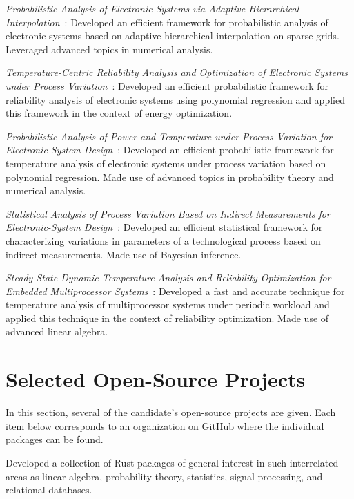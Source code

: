 \documentclass[journal]{IEEEtran}
\begin{document}
\date{2017} \emph{Probabilistic Analysis of Electronic Systems via Adaptive
Hierarchical Interpolation}~\cite{ukhov2017a}: Developed an efficient framework
for probabilistic analysis of electronic systems based on adaptive hierarchical
interpolation on sparse grids. Leveraged advanced topics in numerical analysis.

\date{2015} \emph{Temperature-Centric Reliability Analysis and Optimization of
Electronic Systems under Process Variation}~\cite{ukhov2015}: Developed an
efficient probabilistic framework for reliability analysis of electronic systems
using polynomial regression and applied this framework in the context of energy
optimization.

\date{2014} \emph{Probabilistic Analysis of Power and Temperature under Process
Variation for Electronic-System Design}~\cite{ukhov2014b}: Developed an
efficient probabilistic framework for temperature analysis of electronic systems
under process variation based on polynomial regression. Made use of advanced
topics in probability theory and numerical analysis.

\date{2014} \emph{Statistical Analysis of Process Variation Based on Indirect
Measurements for Electronic-System Design}~\cite{ukhov2014a}: Developed an
efficient statistical framework for characterizing variations in parameters of a
technological process based on indirect measurements. Made use of Bayesian
inference.

\date{2012} \emph{Steady-State Dynamic Temperature Analysis and Reliability
Optimization for Embedded Multiprocessor Systems}~\cite{ukhov2012}: Developed a
fast and accurate technique for temperature analysis of multiprocessor systems
under periodic workload and applied this technique in the context of reliability
optimization. Made use of advanced linear algebra.

\section{Selected Open-Source Projects} 

In this section, several of the candidate's open-source projects are given. Each
item below corresponds to an organization on GitHub where the individual
packages can be found.

\emph{} Developed a collection of Rust packages of general
interest in such interrelated areas as linear algebra, probability theory,
statistics, signal processing, and relational databases.
\end{document}
